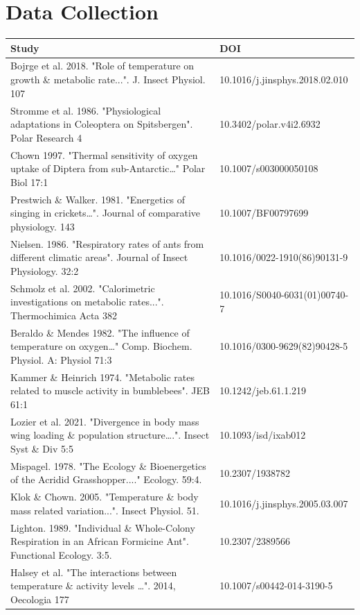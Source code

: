 \documentclass{article}
\begin{document}
\section{Data Collection}
\begin{table}[h]
\tiny
\begin{tabular}{|l|l|}
\hline
\textbf{Study} & \textbf{DOI} \\ \hline
Bojrge et al. 2018. "Role of   temperature on growth \& metabolic rate...". J. Insect Physiol. 107 & 10.1016/j.jinsphys.2018.02.010 \\ \hline
Stromme et al. 1986. "Physiological   adaptations in Coleoptera on Spitsbergen". Polar Research 4 & 10.3402/polar.v4i2.6932 \\ \hline
Chown 1997. "Thermal sensitivity of   oxygen uptake of Diptera from sub-Antarctic…" Polar Biol 17:1 & 10.1007/s003000050108 \\ \hline
Prestwich \& Walker. 1981.   "Energetics of singing in crickets…". Journal of comparative   physiology. 143 & 10.1007/BF00797699 \\ \hline
Nielsen. 1986. "Respiratory rates of   ants from different climatic areas". Journal of Insect Physiology. 32:2 & 10.1016/0022-1910(86)90131-9 \\ \hline
Schmolz et al. 2002. "Calorimetric   investigations on metabolic rates...". Thermochimica Acta 382 & 10.1016/S0040-6031(01)00740-7 \\ \hline
Beraldo \& Mendes 1982. "The influence of temperature on oxygen…" Comp. Biochem. Physiol. A: Physiol 71:3 & 10.1016/0300-9629(82)90428-5 \\ \hline
Kammer \& Heinrich 1974.  "Metabolic rates related to muscle activity in bumblebees". JEB   61:1 & 10.1242/jeb.61.1.219 \\ \hline
Lozier et al. 2021. "Divergence in body mass wing loading \& population structure….". Insect Syst \&   Div 5:5 & 10.1093/isd/ixab012 \\ \hline
Mispagel. 1978. "The Ecology \& Bioenergetics of the Acridid Grasshopper...."   Ecology. 59:4. & 10.2307/1938782 \\ \hline
Klok \& Chown. 2005. "Temperature \& body mass related variation...". Insect Physiol. 51. & 10.1016/j.jinsphys.2005.03.007 \\ \hline
Lighton. 1989. "Individual \& Whole-Colony Respiration in an African Formicine Ant". Functional Ecology. 3:5. & 10.2307/2389566 \\ \hline
Halsey et al. "The interactions  between temperature \& activity levels …". 2014, Oecologia 177 & 10.1007/s00442-014-3190-5 \\ \hline

\end{tabular}
\end{table}
\end{document}
